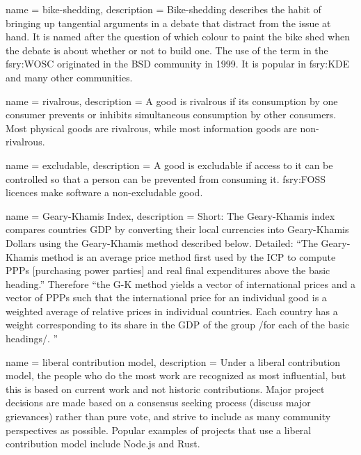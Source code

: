  { name = {bike-shedding},
  description = {Bike-shedding describes the habit of bringing up
    tangential arguments in a debate that distract from the issue at
    hand. It is named after the question of which colour to paint the
    bike shed when the debate is about whether or not to build
    one. The use of the term in the \gls{fsry:WOSC} originated in the
    BSD community in 1999. It is popular in \gls{fsry:KDE} and
    many other communities.}}

 { name = {rivalrous}, description =
  {A good is rivalrous if its consumption by one consumer prevents or
    inhibits simultaneous consumption by other consumers. Most
    physical goods are rivalrous, while most information goods are
    non-rivalrous.}}

 { name = {excludable}, description
  = {A good is excludable if access to it can be controlled so that a
    person can be prevented from consuming it. \gls{fsry:FOSS}
    licences make software a non-excludable good.}}

 { name = {Geary-Khamis Index}, description
    = {Short: The Geary-Khamis index compares countries GDP by converting
    their local currencies into Geary-Khamis Dollars using the Geary-Khamis method described below. Detailed: ``The Geary-Khamis method is an average price method first used by the ICP to compute PPPs [purchasing power parties]
    and real final expenditures above the basic heading.''\cite{fsry:oecd-geary-khamis-2007} Therefore ``the G-K method yields a vector of international prices and a vector of PPPs such that the international price for an individual good is a weighted average of relative prices in individual countries.
    Each country has a weight corresponding to its share in the GDP of the group /for each of the basic headings/.
    ''\cite{fsry:sensitivity-ppp}}}

 { name = {liberal contribution model},
  description = { Under a liberal contribution model, the people who
    do the most work are recognized as most influential, but this is
    based on current work and not historic contributions.  Major
    project decisions are made based on a consensus seeking process
    (discuss major grievances) rather than pure vote, and strive to
    include as many community perspectives as possible.  Popular
    examples of projects that use a liberal contribution model include
    Node.js and
    Rust.\cite{fsry:open-source-guides-leadership-governance}}}


